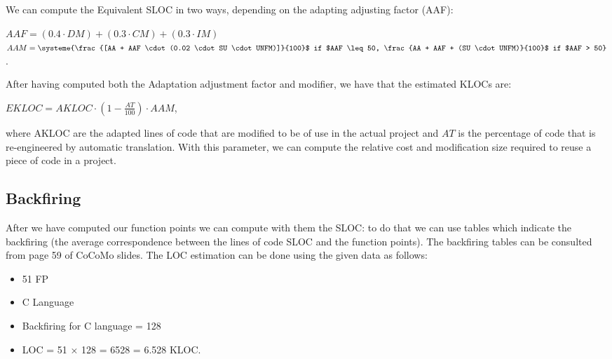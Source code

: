 We can compute the Equivalent SLOC in two ways, depending on the adapting adjusting factor (AAF):
\begin{center}
    $AAF = (0.4 \cdot DM) + (0.3 \cdot CM) + (0.3 \cdot IM)$\\$AAM = \systeme{\frac{[AA + AAF \cdot (0.02 \cdot SU \cdot UNFM)]}{100}$ if $AAF \leq 50, \frac{AA + AAF + (SU \cdot UNFM)}{100}$ if $AAF > 50}$.
\end{center}
After having computed both the Adaptation adjustment factor and modifier, we have that the estimated KLOCs are:
\begin{center}
    $EKLOC = AKLOC \cdot (1 - \frac{AT}{100}) \cdot AAM$,
\end{center}
where AKLOC are the adapted lines of code that are modified to be of use in the actual project and $AT$ is the percentage of code that is re-engineered by automatic translation.
With this parameter, we can compute the relative cost and modification size required to reuse a piece of code in a project.

\subsection{Backfiring}
After we have computed our function points we can compute with them the SLOC: to do that we can use tables which indicate the backfiring (the average correspondence between the lines of code SLOC and the function points).
The backfiring tables can be consulted from page 59 of CoCoMo slides.
The LOC estimation can be done using the given data as follows:
\begin{itemize}
    \item 51 FP
    \item C Language
    \item Backfiring for C language = 128
    \item LOC = 51 × 128 = 6528 = 6.528 KLOC.
\end{itemize}
